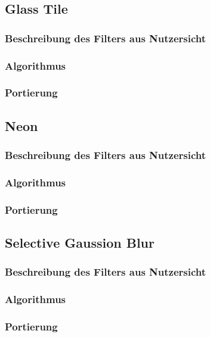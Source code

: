 \documentclass[10pt,a4paper,draft]{article}
\begin{document}
\subsection{Glass Tile} 
\subsubsection{Beschreibung des Filters aus Nutzersicht}
\subsubsection{Algorithmus} 
\subsubsection{Portierung}

\subsection{Neon} 
\subsubsection{Beschreibung des Filters aus Nutzersicht}
\subsubsection{Algorithmus} 
\subsubsection{Portierung}

\subsection{Selective Gaussion Blur} 
\subsubsection{Beschreibung des Filters aus Nutzersicht}
\subsubsection{Algorithmus} 
\subsubsection{Portierung}
\end{document}
